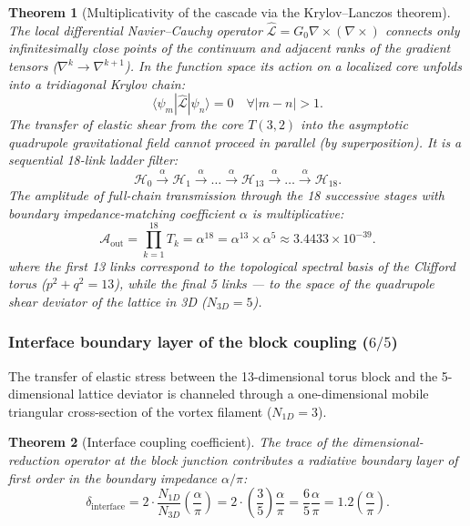 \documentclass[11pt,a4paper]{article}
\newtheorem{theorem}{Theorem}
\theoremstyle{definition}
\theoremstyle{remark}
\begin{document}
\begin{theorem}[Multiplicativity of the cascade via the Krylov--Lanczos theorem]
\label{thm:lanczos_cascade_multiplicative}
The local differential Navier--Cauchy operator $\hat{\mathcal{L}} = G_0 \nabla \times (\nabla \times)$ connects only infinitesimally close points of the continuum and adjacent ranks of the gradient tensors ($\nabla^k \to \nabla^{k+1}$). In the function space its action on a localized core unfolds into a tridiagonal Krylov chain:
\begin{equation}
    \langle \psi_m | \hat{\mathcal{L}} | \psi_n \rangle = 0 \quad \forall |m - n| > 1.
    \label{eq:tridiagonal_krylov_chain}
\end{equation}
The transfer of elastic shear from the core $T(3,2)$ into the asymptotic quadrupole gravitational field cannot proceed in parallel (by superposition). It is a sequential 18-link ladder filter:
\begin{equation}
    \mathcal{H}_0 \xrightarrow{\alpha} \mathcal{H}_1 \xrightarrow{\alpha} \dots \xrightarrow{\alpha} \mathcal{H}_{13} \xrightarrow{\alpha} \dots \xrightarrow{\alpha} \mathcal{H}_{18}.
\end{equation}
The amplitude of full-chain transmission through the 18 successive stages with boundary impedance-matching coefficient $\alpha$ is multiplicative:
\begin{equation}
    \mathcal{A}_{\mathrm{out}} = \prod_{k=1}^{18} T_k = \alpha^{18} = \alpha^{13} \times \alpha^5 \approx 3.4433 \times 10^{-39}.
    \label{eq:lanczos_multiplicative_alpha18}
\end{equation}
where the first 13 links correspond to the topological spectral basis of the Clifford torus ($p^2+q^2 = 13$), while the final 5 links --- to the space of the quadrupole shear deviator of the lattice in 3D ($N_{3D} = 5$).
\end{theorem}


\subsubsection{Interface boundary layer of the block coupling ($6/5$)}

The transfer of elastic stress between the 13-dimensional torus block and the 5-dimensional lattice deviator is channeled through a one-dimensional mobile triangular cross-section of the vortex filament ($N_{1D} = 3$).

\begin{theorem}[Interface coupling coefficient]
\label{thm:interface_coupling_layer}
The trace of the dimensional-reduction operator at the block junction contributes a radiative boundary layer of first order in the boundary impedance $\alpha/\pi$:
\begin{equation}
	\delta_{\mathrm{interface}} = 2 \cdot \frac{N_{1D}}{N_{3D}} \left(\frac{\alpha}{\pi}\right) = 2 \cdot \left(\frac{3}{5}\right)\frac{\alpha}{\pi} = \frac{6}{5}\frac{\alpha}{\pi} = 1.2 \left(\frac{\alpha}{\pi}\right).
	\label{eq:interface_coupling_layer_val}
\end{equation}
\end{theorem}
\end{document}
